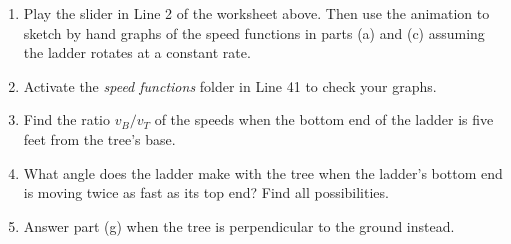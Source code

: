 \documentclass{ximera}
\begin{document}
\begin{question}
\begin{enumerate}
\item Play the slider in Line 2 of the worksheet above. Then use the animation to sketch by hand graphs of the speed functions in parts (a) and (c) assuming the ladder rotates at a constant rate.

\item Activate the \emph{speed functions} folder in Line 41 to check your graphs.

\item Find the ratio $v_B/v_T$ of the speeds when the bottom end of the ladder is five feet from the tree's base.

\item What angle does the ladder make with the tree when the ladder's bottom end is moving twice as fast as its top end? Find all possibilities.

\item Answer part (g) when the tree is perpendicular to the ground instead.

\end{enumerate}

\end{question}
\end{document}
